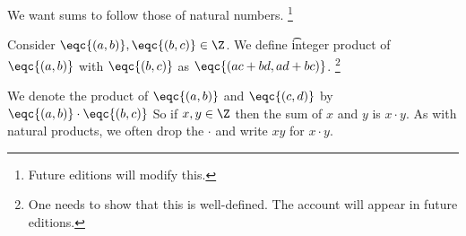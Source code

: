 
We want sums to follow those of natural numbers.
  \ifhmode\unskip\fi\footnote{
Future editions will modify this.
  }


Consider $\eqc{(a, b)}, \eqc{(b, c)} \in \Z $.
We define \t{integer product} of $\eqc{(a, b)}$ with $\eqc{(b, c)}$ as $\eqc{(ac + bd, ad + bc)}$.
  \ifhmode\unskip\fi\footnote{
One needs to show that this is well-defined. The account will appear in future editions.
  }


We denote the product of $\eqc{(a, b)}$ and $\eqc{(c, d)}$ by $\eqc{(a, b)} \cdot  \eqc{(b, c)}$
So if $x, y \in \Z $ then the sum of $x$ and $y$ is $x\cdot y$.
As with natural products, we often drop the $\cdot $ and write $xy$ for $x\cdot y$.

\blankpage
